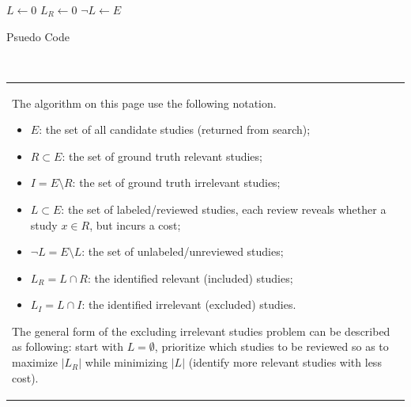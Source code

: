 \documentclass{svjour3}
\theoremstyle{break}
\begin{document}
\noindent
\begin{minipage}[t]{.54\textwidth}
\vspace{0pt}
\centering
\begin{algorithm}[H]
\footnotesize
{}
\BlankLine

$L\leftarrow 0$\; $L_R\leftarrow 0$\; $\neg L\leftarrow E$\; 

\BlankLine
{}
\;
\caption{Psuedo Code}\label{alg:alg1}
\end{algorithm}
\end{minipage}\hfill
\begin{minipage}[t]{.46\textwidth}
\vspace{0pt}
\centering \small
~~~~~~~~\begin{tabular}{p{1.8in}}\hline
\rowcolor{gray!10}
The algorithm on this page use
the following notation. 
\begin{itemize}
\item
$E$: the set of all candidate studies (returned from search);
\item
$R\subset E$: the set of ground truth relevant studies;
\item
$I=E\setminus R$: the set of ground truth irrelevant studies;
\item
$L\subset E$: the set of labeled/reviewed studies, each review reveals whether a study $x\in R$, but incurs a cost;
\item
$\neg L=E\setminus L$: the set of unlabeled/unreviewed studies;
\item
$L_R=L\cap R$: the identified relevant (included) studies;
\item
$L_I=L\cap I$: the identified irrelevant (excluded) studies.
\end{itemize}
The general form of the excluding irrelevant studies problem can be described as following: start with $L=\emptyset$, prioritize which studies to be reviewed so as to maximize $|L_R|$ while minimizing $|L|$ (identify more relevant studies with less cost). \hline
  \end{tabular}
  \label{fig:Problem Statement}
\end{minipage}
\end{document}
